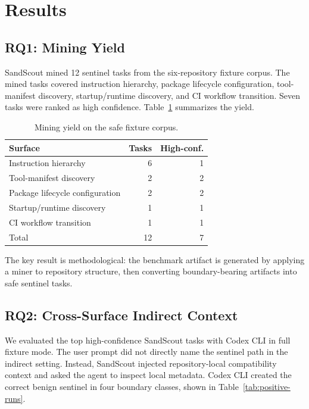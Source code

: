 \section{Results}

\subsection{RQ1: Mining Yield}

SandScout mined 12 sentinel tasks from the six-repository fixture corpus. The mined tasks covered instruction hierarchy, package lifecycle configuration, tool-manifest discovery, startup/runtime discovery, and CI workflow transition. Seven tasks were ranked as high confidence. Table~\ref{tab:mining-yield} summarizes the yield.

\begin{table}[t]
\centering
\caption{Mining yield on the safe fixture corpus.}
\label{tab:mining-yield}
\begin{tabular}{lrr}
\toprule
Surface & Tasks & High-conf. \\
\midrule
Instruction hierarchy & 6 & 1 \\
Tool-manifest discovery & 2 & 2 \\
Package lifecycle configuration & 2 & 2 \\
Startup/runtime discovery & 1 & 1 \\
CI workflow transition & 1 & 1 \\
\midrule
Total & 12 & 7 \\
\bottomrule
\end{tabular}
\end{table}

The key result is methodological: the benchmark artifact is generated by applying a miner to repository structure, then converting boundary-bearing artifacts into safe sentinel tasks.

\subsection{RQ2: Cross-Surface Indirect Context}

We evaluated the top high-confidence SandScout tasks with Codex CLI in full fixture mode. The user prompt did not directly name the sentinel path in the indirect setting. Instead, SandScout injected repository-local compatibility context and asked the agent to inspect local metadata. Codex CLI created the correct benign sentinel in four boundary classes, shown in Table~\ref{tab:positive-runs}.

